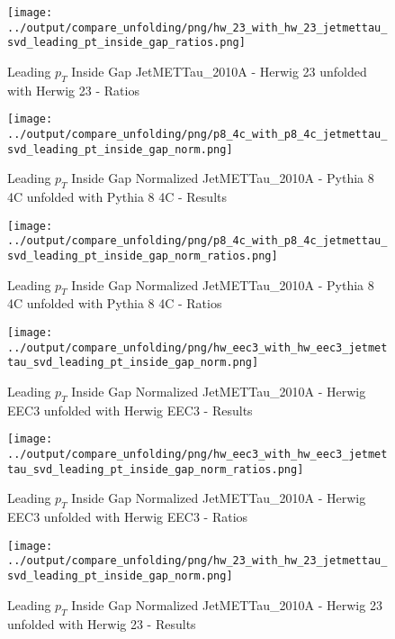 \documentclass[11pt]{book}
\begin{document}
\begin{figure}[ht]
\centering
\texttt{[image: ../output/compare\_unfolding/png/hw\_23\_with\_hw\_23\_jetmettau\_svd\_leading\_pt\_inside\_gap\_ratios.png]}
\caption{Leading $p_{T}$ Inside Gap JetMETTau\_2010A - Herwig 23 unfolded with Herwig 23 - Ratios}
\label{hw_23_hw_23_jetmettau_svd_leading_pt_inside_gap_b}
\end{figure}


\begin{figure}[ht]
\centering
\texttt{[image: ../output/compare\_unfolding/png/p8\_4c\_with\_p8\_4c\_jetmettau\_svd\_leading\_pt\_inside\_gap\_norm.png]}
\caption{Leading $p_{T}$ Inside Gap Normalized JetMETTau\_2010A - Pythia 8 4C unfolded with Pythia 8 4C - Results}
\label{p8_p8_jetmettau_svd_leading_pt_inside_gap_norm_a}
\end{figure}

\begin{figure}[ht]
\centering
\texttt{[image: ../output/compare\_unfolding/png/p8\_4c\_with\_p8\_4c\_jetmettau\_svd\_leading\_pt\_inside\_gap\_norm\_ratios.png]}
\caption{Leading $p_{T}$ Inside Gap Normalized JetMETTau\_2010A - Pythia 8 4C unfolded with Pythia 8 4C - Ratios}
\label{p8_p8_jetmettau_svd_leading_pt_inside_gap_norm_b}
\end{figure}

\begin{figure}[ht]
\centering
\texttt{[image: ../output/compare\_unfolding/png/hw\_eec3\_with\_hw\_eec3\_jetmettau\_svd\_leading\_pt\_inside\_gap\_norm.png]}
\caption{Leading $p_{T}$ Inside Gap Normalized JetMETTau\_2010A - Herwig EEC3 unfolded with Herwig EEC3 - Results}
\label{hw_eec3_hw_eec3_jetmettau_svd_leading_pt_inside_gap_norm_a}
\end{figure}

\begin{figure}[ht]
\centering
\texttt{[image: ../output/compare\_unfolding/png/hw\_eec3\_with\_hw\_eec3\_jetmettau\_svd\_leading\_pt\_inside\_gap\_norm\_ratios.png]}
\caption{Leading $p_{T}$ Inside Gap Normalized JetMETTau\_2010A - Herwig EEC3 unfolded with Herwig EEC3 - Ratios}
\label{hw_eec3_hw_eec3_jetmettau_svd_leading_pt_inside_gap_norm_b}
\end{figure}

\begin{figure}[ht]
\centering
\texttt{[image: ../output/compare\_unfolding/png/hw\_23\_with\_hw\_23\_jetmettau\_svd\_leading\_pt\_inside\_gap\_norm.png]}
\caption{Leading $p_{T}$ Inside Gap Normalized JetMETTau\_2010A - Herwig 23 unfolded with Herwig 23 - Results}
\label{hw_23_hw_23_jetmettau_svd_leading_pt_inside_gap_norm_a}
\end{figure}
\end{document}
